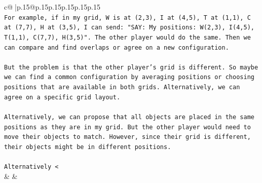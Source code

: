 \documentclass{article}
\begin{document}
{\begin{supertabular}{c@{$\;$}|p{.15\linewidth}@{}p{.15\linewidth}p{.15\linewidth}p{.15\linewidth}p{.15\linewidth}p{.15\linewidth}}
{{{\\ 
\texttt{For example, if in my grid, W is at (2,3), I at (4,5), T at (1,1), C at (7,7), H at (3,5), I can send: "SAY: My positions: W(2,3), I(4,5), T(1,1), C(7,7), H(3,5)". The other player would do the same. Then we can compare and find overlaps or agree on a new configuration. } \\
\\ 
\texttt{But the problem is that the other player's grid is different. So maybe we can find a common configuration by averaging positions or choosing positions that are available in both grids. Alternatively, we can agree on a specific grid layout. } \\
\\ 
\texttt{Alternatively, we can propose that all objects are placed in the same positions as they are in my grid. But the other player would need to move their objects to match. However, since their grid is different, their objects might be in different positions. } \\
\\ 
\texttt{Alternatively <} \\
            }
        }
    }
    & & \\ \\


\end{supertabular}}
\end{document}
